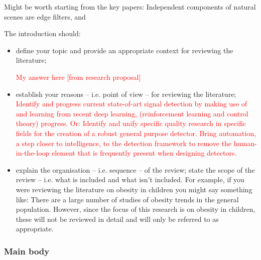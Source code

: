 \documentclass[12pt]{llncs}
\begin{document}
\color{red} 

Might be worth starting from the key papers: Independent components of natural scenes are edge filters, and 


The introduction should:
\begin{itemize}
	\item {define your topic and provide an appropriate context for reviewing the literature;}
	
	\textcolor{red}{My answer here [from research proposal]}
	\item establish your reasons – i.e. point of view – for
	reviewing the literature;
	\textcolor{red}{Identify and progress current state-of-art signal detection by making use of and learning from recent deep learning, (reinforcement learning and control theory) progress. Or: Identify and unify specific quality research in specific fields for the creation of a robust general purpose detector. Bring automation, a step closer to intelligence, to the detection framework to remove the human-in-the-loop element that is frequently present when designing detectors.}
	\item explain the organisation – i.e. sequence – of the review;
	state the scope of the review – i.e. what is included and what isn’t included. For example, if you were reviewing the literature on obesity in children you might say something like: There are a large number of studies of obesity trends in the general population. However, since the focus of this research is on obesity in children, these will not be reviewed in detail and will only be referred to as appropriate.
\end{itemize}



\subsubsection*{Main body}
\end{document}
